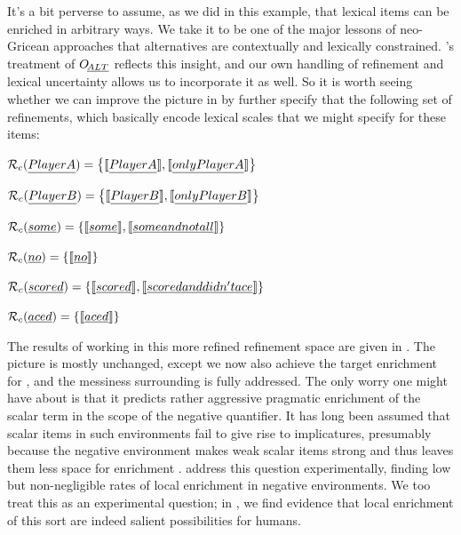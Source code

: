 \documentclass[leqno]{article}
\begin{document}
It's a bit perverse to assume, as we did in this example, that lexical
items can be enriched in arbitrary ways. We take it to be one of the
major lessons of neo-Gricean approaches that alternatives are
contextually and lexically constrained. \CFS's treatment of $\mathop{O\negthinspace_{\emph{ALT}}}$
reflects this insight, and our own handling of refinement and lexical
uncertainty allows us to incorporate it as well. So it is worth seeing
whether we can improve the picture in  by further
specify that the following set of refinements, which basically encode
lexical scales that we might specify for these items:
%
\begin{examples}
\item\label{neo}
  \begin{examples}
  \item $\mathcal{R}_{c}(\emph{Player A}) = \left\{ \llbracket\emph{Player A}\rrbracket, \llbracket\emph{only Player A}\rrbracket \right\}$
  \item $\mathcal{R}_{c}(\emph{Player B}) = \left\{ \llbracket\emph{Player B}\rrbracket, \llbracket\emph{only Player B}\rrbracket \right\}$
  \item $\mathcal{R}_{c}(\emph{some}) = \left\{ \llbracket\emph{some}\rrbracket, \llbracket\emph{some and not all}\rrbracket \right\}$
  \item $\mathcal{R}_{c}(\emph{no}) = \left\{ \llbracket\emph{no}\rrbracket \right\}$    
  \item $\mathcal{R}_{c}(\emph{scored}) = \left\{ \llbracket\emph{scored}\rrbracket, \llbracket\emph{scored and didn't ace}\rrbracket \right\}$
  \item $\mathcal{R}_{c}(\emph{aced}) = \left\{ \llbracket\emph{aced}\rrbracket \right\}$
  \end{examples}
\end{examples}
%
The results of working in this more refined refinement space are given
in . The picture is mostly unchanged,
except we now also achieve the target enrichment for , and the messiness surrounding  is
fully addressed. The only worry one might have about
 is that it predicts rather aggressive
pragmatic enrichment of the scalar term in the scope of the negative
quantifier. It has long been assumed that scalar items in such
environments fail to give rise to implicatures, presumably because the
negative environment makes weak scalar items strong and thus leaves
them less space for enrichment
\citep{Levinson00}. \citet{Chemla:Spector:2011} address this question
experimentally, finding low but non-negligible rates of local
enrichment in negative environments. We too treat this as an
experimental question; in , we find evidence that
local enrichment of this sort are indeed salient possibilities for
humans.
\end{document}
